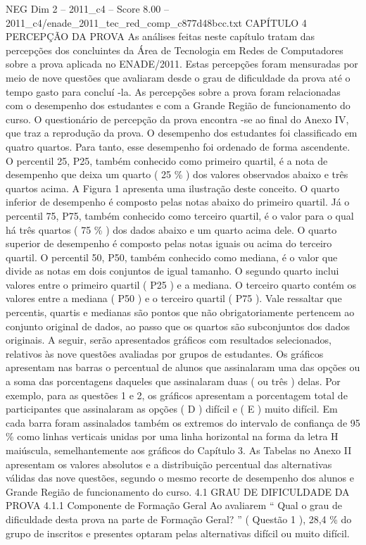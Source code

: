 \begin{textsample}{NEG Dim 2 – 2011\_c4 – Score 8.00 – 2011\_c4/enade\_2011\_tec\_red\_comp\_c877d48bcc.txt}  \label{ex:f2_neg_309}
CAPÍTULO 4 PERCEPÇÃO DA PROVA As análises feitas neste capítulo tratam das percepções dos concluintes da Área de Tecnologia em Redes de Computadores sobre a prova aplicada no ENADE/2011.
Estas percepções foram mensuradas por meio de nove questões que avaliaram desde o grau de dificuldade da prova até o tempo gasto para concluí -la.
As percepções sobre a prova foram relacionadas com o desempenho dos estudantes e com a Grande Região de funcionamento do curso.
O questionário de percepção da prova encontra -se ao final do Anexo IV, que traz a reprodução da prova.
O desempenho dos estudantes foi classificado em quatro quartos.
Para tanto, esse desempenho foi ordenado de forma ascendente.
O percentil 25, P25, também conhecido como primeiro quartil, é a nota de desempenho que deixa um quarto ( 25 \% ) dos valores observados abaixo e três quartos acima.
A Figura 1 apresenta uma ilustração deste conceito.
O quarto inferior de desempenho é composto pelas notas abaixo do primeiro quartil.
Já o percentil 75, P75, também conhecido como terceiro quartil, é o valor para o qual há três quartos ( 75 \% ) dos dados abaixo e um quarto acima dele.
O quarto superior de desempenho é composto pelas notas iguais ou acima do terceiro quartil.
O percentil 50, P50, também conhecido como mediana, é o valor que divide as notas em dois conjuntos de igual tamanho.
O segundo quarto inclui valores entre o primeiro quartil ( P25 ) e a mediana.
O terceiro quarto contém os valores entre a mediana ( P50 ) e o terceiro quartil ( P75 ).
Vale ressaltar que percentis, quartis e medianas são pontos que não obrigatoriamente pertencem ao conjunto original de dados, ao passo que os quartos são subconjuntos dos dados originais.
A seguir, serão apresentados gráficos com resultados selecionados, relativos às nove questões avaliadas por grupos de estudantes.
Os gráficos apresentam nas barras o percentual de alunos que assinalaram uma das opções ou a soma das porcentagens daqueles que assinalaram duas ( ou três ) delas.
Por exemplo, para as questões 1 e 2, os gráficos apresentam a porcentagem total de participantes que assinalaram as opções ( D ) difícil e ( E ) muito difícil.
Em cada barra foram assinalados também os extremos do intervalo de confiança de 95 \% como linhas verticais unidas por uma linha horizontal na forma da letra H maiúscula, semelhantemente aos gráficos do Capítulo 3.
As Tabelas no Anexo II apresentam os valores absolutos e a distribuição percentual das alternativas válidas das nove questões, segundo o mesmo recorte de desempenho dos alunos e Grande Região de funcionamento do curso. 4.1 GRAU DE DIFICULDADE DA PROVA 4.1.1 Componente de Formação Geral Ao avaliarem “ Qual o grau de dificuldade desta prova na parte de Formação Geral? ” ( Questão 1 ), 28,4 \% do grupo de inscritos e presentes optaram pelas alternativas difícil ou muito difícil.

\end{textsample}

